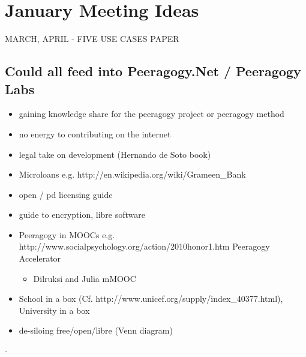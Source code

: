 \section{January Meeting Ideas}

MARCH, APRIL - FIVE USE CASES PAPER

\subsection{Could all feed into Peeragogy.Net / Peeragogy Labs}
\begin{itemize}
\item gaining knowledge share for the peeragogy project or peeragogy method 
\item no energy to contributing on the internet 
\item legal take on development (Hernando de Soto book) 
\item Microloans e.g. http://en.wikipedia.org/wiki/Grameen_Bank 
\item open / pd licensing guide 
\item guide to encryption, libre software 
\item Peeragogy in MOOCs e.g. http://www.socialpsychology.org/action/2010honor1.htm Peeragogy Accelerator 
\begin{itemize}
\item Dilruksi and Julia mMOOC
\end{itemize}
\item School in a box (Cf. http://www.unicef.org/supply/index_40377.html), University in a box
\item de-siloing free/open/libre (Venn diagram)
\end{itemize}
  - 